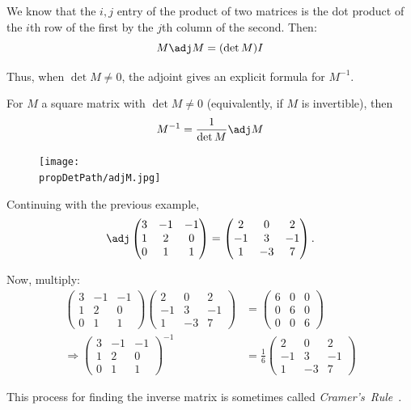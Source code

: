 We know that the $i,j$ entry of the product of two matrices is the dot product of the $i$th row of the first by the $j$th column of the second.  Then:
\[
M\adj M = (\det M) I
\]

Thus, when $\det M\neq 0$, the adjoint gives an explicit formula for $M^{-1}$.


\begin{theorem}
For $M$ a square matrix with $\det M\neq 0$ (equivalently, if $M$ is invertible), then
\[
M^{-1}=\frac{1}{\det M}\adj M
\]
\end{theorem}



\begin{figure}
\begin{center}
\texttt{[image: \\propDetPath/adjM.jpg]}
\end{center}
\end{figure}

\begin{example}
Continuing with the previous example,
\[
\adj \begin{pmatrix}
3 & -1 & -1 \\
1 & 2 & 0 \\
0 & 1 & 1 \\
\end{pmatrix} = \begin{pmatrix}
2 & 0 & 2 \\
-1 & 3 & -1 \\
1 & -3 & 7 \\
\end{pmatrix}.
\]

Now, multiply:
\begin{align*}
\begin{pmatrix}
3 & -1 & -1 \\
1 & 2 & 0 \\
0 & 1 & 1 
\end{pmatrix}
\begin{pmatrix}
2 & 0 & 2 \\
-1 & 3 & -1 \\
1 & -3 & 7 
\end{pmatrix}
&=
\begin{pmatrix}
6 & 0 & 0 \\
0 & 6 & 0 \\
0 & 0 & 6 
\end{pmatrix} \\[1mm]
\Rightarrow \begin{pmatrix}
3 & -1 & -1 \\
1 & 2 & 0 \\
0 & 1 & 1 
\end{pmatrix}^{-1}
& = \frac{1}{6}\begin{pmatrix}
2 & 0 & 2 \\
-1 & 3 & -1 \\
1 & -3 & 7 
\end{pmatrix}
\end{align*}

This process for finding the inverse matrix is sometimes called \emph{Cramer's~Rule}~.
\end{example}

